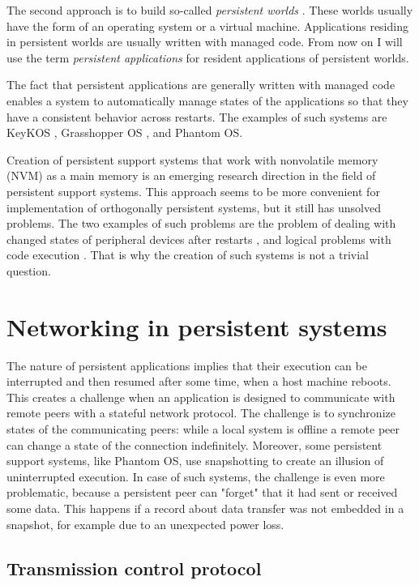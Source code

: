 The second approach is to build so-called \textit{persistent worlds} 
\cite{atkinson1995orthogonally}. These worlds usually have the form of an
operating system or a virtual machine. Applications residing in persistent
worlds are usually written with managed code. From now on I will use the term
\textit{persistent applications} for resident applications of persistent
worlds.

The fact that persistent applications are generally written with managed code
enables a system to automatically manage states of the applications so that they
have a consistent behavior across restarts. The examples of such systems are
KeyKOS \cite{bomberger1992keykos}, Grasshopper OS \cite{dearle1994grasshopper},
and Phantom OS. 

Creation of persistent support systems that work with nonvolatile memory (NVM)
as a main memory is an emerging research direction in the field of persistent
support systems. This approach seems to be more convenient for implementation
of orthogonally persistent systems, but it still has unsolved problems. The two
examples of such problems are the problem of dealing with changed states of
peripheral devices after restarts \cite{berthou2018peripheral}, and logical
problems with code execution \cite{ransford2014nonvolatile}. That is why the
creation of such systems is not a trivial question. 

\section{Networking in persistent systems}
\label{sec:lr:networking}

The nature of persistent applications implies that their execution can be
interrupted and then resumed after some time, when a host machine reboots. This
creates a challenge when an application is designed to communicate with remote
peers with a stateful network protocol. The challenge is to synchronize
states of the communicating peers: while a local system is offline a remote peer
can change a state of the connection indefinitely. Moreover, some persistent
support systems, like Phantom OS, use snapshotting to create an illusion of
uninterrupted execution. In case of such systems, the challenge is even more
problematic, because a persistent peer can "forget" that it had sent or received
some data. This happens if a record about data transfer was not embedded in a
snapshot, for example due to an unexpected power loss.

\subsection{Transmission control protocol}
\label{lr:tcp}

